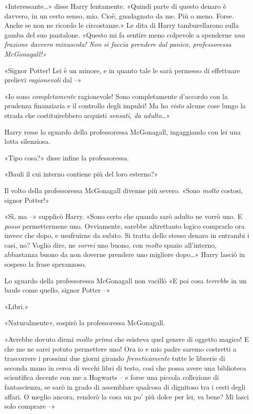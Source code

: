 «Interessante…» disse Harry lentamente. «Quindi parte di questo denaro è davvero, in un certo senso, mio. Cioè, guadagnato da me. Più o meno. Forse. Anche se non ne ricordo le circostanze.» Le dita di Harry tamburellarono sulla gamba del suo pantalone. «Questo mi fa sentire meno colpevole a spenderne \textit{una frazione davvero minuscola! Non si faccia prendere dal panico, professoressa McGonagall!»}

«Signor Potter! Lei è un minore, e in quanto tale le sarà permesso di effettuare prelievi \textit{ragionevoli} dal –»

«Io sono \textit{completamente} ragionevole! Sono completamente d’accordo con la prudenza finanziaria e il controllo degli impulsi! Ma ho \textit{visto} alcune cose lungo la strada che costituirebbero acquisti \textit{sensati, da adulto}…»

Harry resse lo sguardo della professoressa McGonagall, ingaggiando con lei una lotta silenziosa.

«Tipo cosa?» disse infine la professoressa.

«Bauli il cui interno contiene più del loro esterno?»

Il volto della professoressa McGonagall divenne più severo. «Sono \textit{molto} costosi, signor Potter!»

«Sì, ma –» supplicò Harry. «Sono certo che quando sarò adulto ne vorrò uno. E \textit{posso} permettermene uno. Ovviamente, sarebbe altrettanto logico comprarlo ora invece che dopo, e usufruirne da subito. Si tratta dello stesso denaro in entrambi i casi, no? Voglio dire, ne \textit{vorrei} uno buono, con \textit{molto} spazio all’interno, abbastanza buono da non doverne prendere uno migliore dopo…» Harry lasciò in sospeso la frase speranzoso.

Lo sguardo della professoressa McGonagall non vacillò «E poi cosa \textit{terrebbe} in un baule come quello, signor Potter –»

«Libri.»

«Naturalmente», sospirò la professoressa McGonagall.

«Avrebbe dovuto dirmi \textit{molto prima} che esisteva quel genere di oggetto magico! E che me ne sarei potuto permettere uno! Ora io e mio padre saremo costretti a trascorrere i prossimi due giorni girando \textit{freneticamente} tutte le librerie di seconda mano in cerca di vecchi libri di testo, così che possa avere una biblioteca scientifica decente con me a Hogwarts – e forse una piccola collezione di fantascienza, se sarò in grado di assemblare qualcosa di dignitoso tra i cesti degli affari. O meglio ancora, renderò la cosa un po’ più dolce per lei, va bene? Mi lasci solo comprare –»

